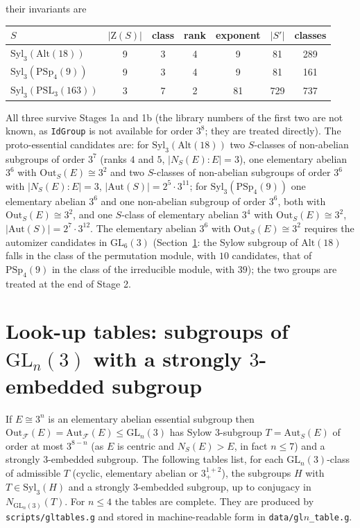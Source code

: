 \documentclass[11pt]{article}
\theoremstyle{definition}
\theoremstyle{remark}
\newcommand{\F}{\mathcal{F}}
\newcommand{\Aut}{\mathrm{Aut}}
\newcommand{\Out}{\mathrm{Out}}
\newcommand{\Syl}{\mathrm{Syl}}
\newcommand{\GL}{\mathrm{GL}}
\newcommand{\PSL}{\mathrm{PSL}}
\newcommand{\PSp}{\mathrm{PSp}}
\newcommand{\Alt}{\mathrm{Alt}}
\newcommand{\Z}{\mathrm{Z}}
\begin{document}
their invariants are
\begin{center}
\begin{tabular}{lcccccc}
\toprule
$S$ & $|\Z(S)|$ & class & rank & exponent & $|S'|$ & classes\\
\midrule
$\Syl_3(\Alt(18))$ & 9 & 3 & 4 & 9 & 81 & 289\\
$\Syl_3(\PSp_4(9))$ & 9 & 3 & 4 & 9 & 81 & 161\\
$\Syl_3(\PSL_3(163))$ & 3 & 7 & 2 & 81 & 729 & 737\\
\bottomrule
\end{tabular}
\end{center}
All three survive Stages 1a and 1b (the library numbers of the first two
are not known, as \texttt{IdGroup} is not available for order $3^8$; they
are treated directly).  The proto-essential candidates are: for
$\Syl_3(\Alt(18))$ two $S$-classes of non-abelian subgroups of order
$3^7$ (ranks $4$ and $5$, $|N_S(E):E|=3$), one elementary abelian
$3^6$ with $\Out_S(E)\cong3^2$ and two $S$-classes of non-abelian
subgroups of order $3^6$ with $|N_S(E):E|=3$, $|\Aut(S)|=2^5\cdot3^{11}$;
for $\Syl_3(\PSp_4(9))$ one elementary abelian $3^6$ and one non-abelian
subgroup of order $3^6$, both with $\Out_S(E)\cong3^2$, and one $S$-class
of elementary abelian $3^4$ with $\Out_S(E)\cong3^2$,
$|\Aut(S)|=2^7\cdot3^{12}$.  The elementary abelian $3^6$ with
$\Out_S(E)\cong3^2$ requires the automizer candidates in $\GL_6(3)$
(Section~\ref{sec:lookup}: the Sylow subgroup of $\Alt(18)$ falls in the
class of the permutation module, with $10$ candidates, that of
$\PSp_4(9)$ in the class of the irreducible module, with $39$); the two
groups are treated at the end of Stage 2.

\section{Look-up tables: subgroups of $\GL_n(3)$ with a strongly $3$-embedded subgroup}\label{sec:lookup}

If $E\cong 3^n$ is an elementary abelian essential subgroup then
$\Out_\F(E)=\Aut_\F(E)\le\GL_n(3)$ has Sylow $3$-subgroup $T=\Aut_S(E)$
of order at most $3^{8-n}$ (as $E$ is centric and $N_S(E)>E$, in fact
$n\le 7$) and a strongly $3$-embedded subgroup.  The following tables list,
for each $\GL_n(3)$-class of admissible $T$ (cyclic, elementary abelian or
$3^{1+2}_+$), the subgroups $H$ with $T\in\Syl_3(H)$ and a strongly
$3$-embedded subgroup, up to conjugacy in $N_{\GL_n(3)}(T)$.  For $n\le4$ the
tables are complete.  They are produced by \texttt{scripts/gltables.g} and
stored in machine-readable form in \texttt{data/gl$n$\_table.g}.
\end{document}
